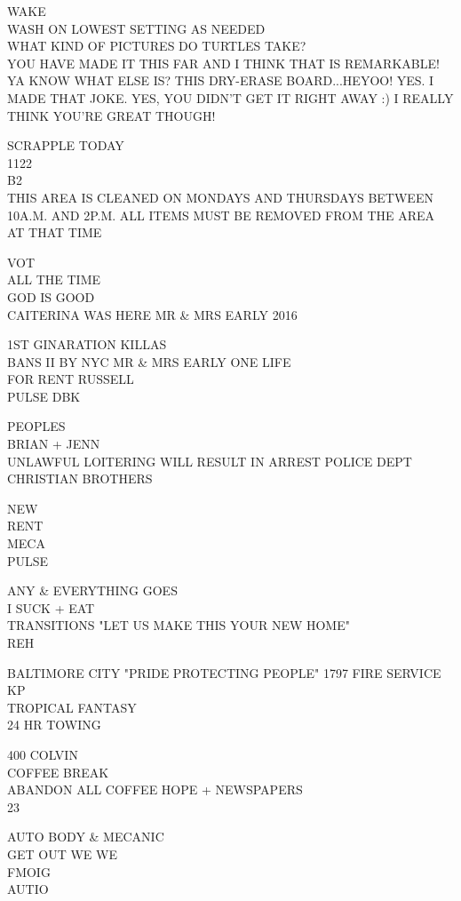 \documentclass[10pt,letterpaper]{article}
\begin{document}
WAKE\\
WASH ON LOWEST SETTING AS NEEDED\\
WHAT KIND OF PICTURES DO TURTLES TAKE?\\
YOU HAVE MADE IT THIS FAR AND I THINK THAT IS REMARKABLE!  YA KNOW WHAT ELSE IS?  THIS DRY{-}ERASE BOARD...HEYOO! YES.  I MADE THAT JOKE.  YES, YOU DIDN'T GET IT RIGHT AWAY :) I REALLY THINK YOU'RE GREAT THOUGH!

SCRAPPLE TODAY\\
1122\\
B2\\
THIS AREA IS CLEANED ON MONDAYS AND THURSDAYS BETWEEN 10A.M. AND 2P.M. ALL ITEMS MUST BE REMOVED FROM THE AREA AT THAT TIME

VOT\\
ALL THE TIME\\
GOD IS GOOD\\
CAITERINA WAS HERE MR \& MRS EARLY 2016

1ST GINARATION KILLAS\\
BANS II BY NYC MR \& MRS EARLY ONE LIFE\\
FOR RENT RUSSELL\\
PULSE DBK

PEOPLES\\
BRIAN + JENN\\
UNLAWFUL LOITERING WILL RESULT IN ARREST POLICE DEPT\\
CHRISTIAN BROTHERS

NEW\\
RENT\\
MECA\\
PULSE

ANY \& EVERYTHING GOES\\
I SUCK + EAT\\
TRANSITIONS "LET US MAKE THIS YOUR NEW HOME"\\
REH

BALTIMORE CITY "PRIDE PROTECTING PEOPLE" 1797 FIRE SERVICE\\
KP\\
TROPICAL FANTASY\\
24 HR TOWING

400 COLVIN\\
COFFEE BREAK\\
ABANDON ALL COFFEE HOPE + NEWSPAPERS\\
23

AUTO BODY \& MECANIC\\
GET OUT WE WE\\
FMOIG\\
AUTIO
\end{document}
